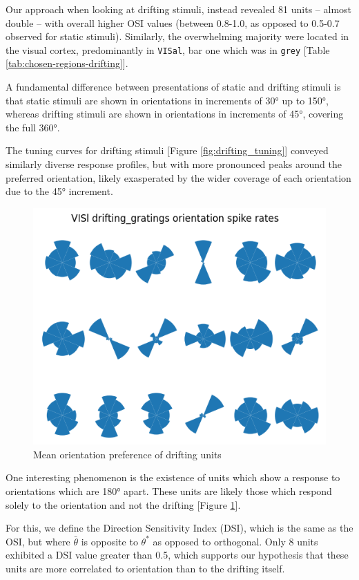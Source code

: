 \documentclass[10pt,twocolumn]{article}
\begin{document}
Our approach when looking at drifting stimuli, instead revealed 81 units -- almost double -- with overall higher OSI values (between 0.8-1.0, as opposed to 0.5-0.7 observed for static stimuli). Similarly, the overwhelming majority were located in the visual cortex, predominantly in \texttt{VISal}, bar one which was in \texttt{grey} [Table \ref{tab:chosen-regions-drifting}].

A fundamental difference between presentations of static and drifting stimuli is that static stimuli are shown in orientations in increments of 30° up to 150°, whereas drifting stimuli are shown in orientations in increments of 45°, covering the full 360°.

The tuning curves for drifting stimuli [Figure \ref{fig:drifting_tuning}] conveyed similarly diverse response profiles, but with more pronounced peaks around the preferred orientation, likely exasperated by the wider coverage of each orientation due to the 45° increment.

\begin{figure}[h]
  \centering
  \includegraphics[width=0.6\linewidth]{report_images/drifting_unit_mean_orientation.png}
  \caption{Mean orientation preference of drifting units}
  \label{fig:drifting_unit_mean_orientation}
\end{figure}

One interesting phenomenon is the existence of units which show a response to orientations which are 180° apart.  These units are likely those which respond solely to the orientation and not the drifting [Figure \ref{fig:drifting_unit_mean_orientation}].

For this, we define the Direction Sensitivity Index (DSI), which is the same as the OSI, but where \(\bar\theta\) is opposite to \(\theta^*\) as opposed to orthogonal.  Only 8 units exhibited a DSI value greater than 0.5, which supports our hypothesis that these units are more correlated to orientation than to the drifting itself.
\end{document}
